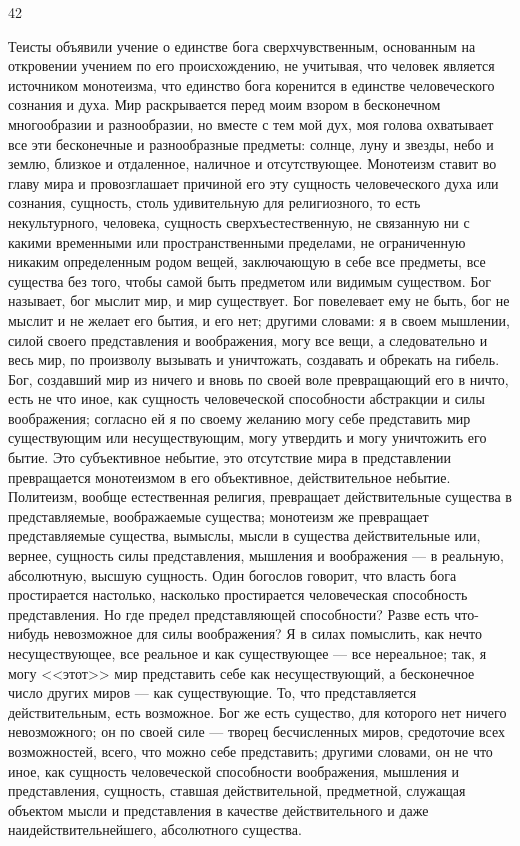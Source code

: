 \documentclass[12pt]{article}
\begin{document}
42

Теисты объявили учение о единстве бога сверхчувственным, основанным на откровении учением по его происхождению, не учитывая, что человек является источником монотеизма, что единство бога коренится в единстве человеческого сознания и духа. Мир раскрывается перед моим взором в бесконечном многообразии и разнообразии, но вместе с тем мой дух, моя голова охватывает все эти бесконечные и разнообразные предметы: солнце, луну и звезды, небо и землю, близкое и отдаленное, наличное и отсутствующее. Монотеизм ставит во главу мира и провозглашает причиной его эту сущность человеческого духа или сознания, сущность, столь удивительную для религиозного, то есть некультурного, человека, сущность сверхъестественную, не связанную ни с какими временными или пространственными пределами, не ограниченную никаким определенным родом вещей, заключающую в себе все предметы, все существа без того, чтобы самой быть предметом или видимым существом. Бог называет, бог мыслит мир, и мир существует. Бог повелевает ему не быть, бог не мыслит и не желает его бытия, и его нет; другими словами: я в своем мышлении, силой своего представления и воображения, могу все вещи, а следовательно и весь мир, по произволу вызывать и уничтожать, создавать и обрекать на гибель. Бог, создавший мир из ничего и вновь по своей воле превращающий его в ничто, есть не что иное, как сущность человеческой способности абстракции и силы воображения; согласно ей я по своему желанию могу себе представить мир существующим или несуществующим, могу утвердить и могу уничтожить его бытие. Это субъективное небытие, это отсутствие мира в представлении превращается монотеизмом в его объективное, действительное небытие. Политеизм, вообще естественная религия, превращает действительные существа в представляемые, воображаемые существа; монотеизм же превращает представляемые существа, вымыслы, мысли в существа действительные или, вернее, сущность силы представления, мышления и воображения --- в реальную, абсолютную, высшую сущность. Один богослов говорит, что власть бога простирается настолько, насколько простирается человеческая способность представления. Но где предел представляющей способности? Разве есть что-нибудь невозможное для силы воображения? Я в силах помыслить, как нечто несуществующее, все реальное и как существующее --- все нереальное; так, я могу <<этот>> мир представить себе как несуществующий, а бесконечное число других миров --- как существующие. То, что представляется действительным, есть возможное. Бог же есть существо, для которого нет ничего невозможного; он по своей силе --- творец бесчисленных миров, средоточие всех возможностей, всего, что можно себе представить; другими словами, он не что иное, как сущность человеческой способности воображения, мышления и представления, сущность, ставшая действительной, предметной, служащая объектом мысли и представления в качестве действительного и даже наидействительнейшего, абсолютного существа.
\end{document}
